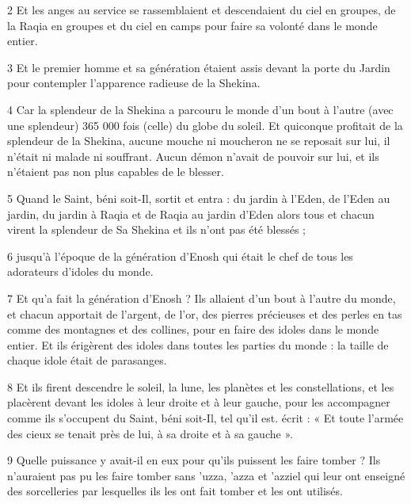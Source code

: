 \par 2 Et les anges au service se rassemblaient et descendaient du ciel en groupes, de la Raqia en groupes et du ciel en camps pour faire sa volonté dans le monde entier.

\par 3 Et le premier homme et sa génération étaient assis devant la porte du Jardin pour contempler l'apparence radieuse de la Shekina.

\par 4 Car la splendeur de la Shekina a parcouru le monde d'un bout à l'autre (avec une splendeur) 365 000 fois (celle) du globe du soleil. Et quiconque profitait de la splendeur de la Shekina, aucune mouche ni moucheron ne se reposait sur lui, il n'était ni malade ni souffrant. Aucun démon n’avait de pouvoir sur lui, et ils n’étaient pas non plus capables de le blesser.

\par 5 Quand le Saint, béni soit-Il, sortit et entra : du jardin à l'Eden, de l'Eden au jardin, du jardin à Raqia et de Raqia au jardin d'Eden alors tous et chacun virent la splendeur de Sa Shekina et ils n'ont pas été blessés ;

\par 6 jusqu'à l'époque de la génération d'Enosh qui était le chef de tous les adorateurs d'idoles du monde.

\par 7 Et qu'a fait la génération d'Enosh ? Ils allaient d'un bout à l'autre du monde, et chacun apportait de l'argent, de l'or, des pierres précieuses et des perles en tas comme des montagnes et des collines, pour en faire des idoles dans le monde entier. Et ils érigèrent des idoles dans toutes les parties du monde : la taille de chaque idole était de parasanges.

\par 8 Et ils firent descendre le soleil, la lune, les planètes et les constellations, et les placèrent devant les idoles à leur droite et à leur gauche, pour les accompagner comme ils s'occupent du Saint, béni soit-Il, tel qu'il est. écrit : « Et toute l’armée des cieux se tenait près de lui, à sa droite et à sa gauche ».

\par 9 Quelle puissance y avait-il en eux pour qu'ils puissent les faire tomber ? Ils n'auraient pas pu les faire tomber sans 'uzza, 'azza et 'azziel qui leur ont enseigné des sorcelleries par lesquelles ils les ont fait tomber et les ont utilisés.

